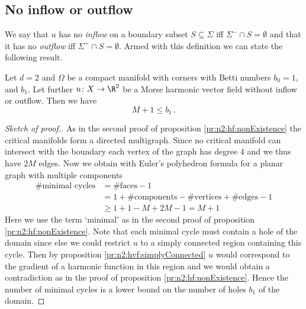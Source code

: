 \subsection{No inflow or outflow}

We say that $u$ has no \emph{inflow} on a boundary subset $S\subseteq\Sigma$ iff $\Sigma^-\cap S=\emptyset$ and
that it has no \emph{outflow} iff $\Sigma^+\cap S=\emptyset$.
Armed with this definition we can state the following result.
\begin{proposition}
  Let $d=2$ and $\Omega$ be a compact manifold with corners with Betti numbers $b_0=1$, and $b_1$.
  Let further $u\colon X\to\R^2$ be 
  a Morse harmonic vector field without inflow or outflow.
  Then we have $$M+1\leq b_1\,.$$
\end{proposition}
\begin{proof}[Sketch of proof.]
  As in the second proof of proposition \ref{pr:n2:hf:nonExistence} the critical manifolds form a directed multigraph.
  Since no critical manifold can intersect with the boundary each vertex
  of the graph has degree 4 and we thus have $2M$ edges. Now we obtain with Euler's polyhedron formula
  for a planar graph with multiple components
  \begin{align*}
    \text{\# minimal cycles}
    &= \text{\#faces}-1 \\
    &= 1+\text{\#components}-\text{\#vertices}+\text{\#edges} -1 \\
    &\geq 1+1-M+2M -1 = M+1
  \end{align*}
  Here we use the term `minimal' as in the second proof of proposition \ref{pr:n2:hf:nonExistence}.
  Note that each minimal cycle must contain a hole of the domain since else we could restrict $u$ to a simply
  connected region containing this cycle. Then by proposition \ref{pr:n2:hvf:simplyConnected} $u$ would correspond to the gradient of 
  a harmonic function in this region and we would obtain a contradiction as in the proof of proposition \ref{pr:n2:hf:nonExistence}.
  Hence the number of minimal cycles is a lower bound on the number of holes $b_1$ of the domain.
\end{proof}

